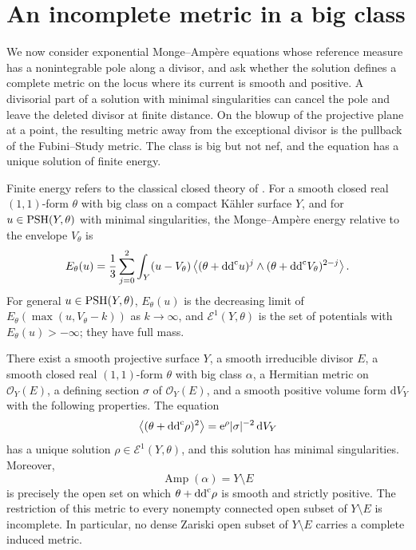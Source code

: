 \section{An incomplete metric in a big class}
\label{sec:incomplete-divisorial-metric}

We now consider exponential Monge--Amp\`ere equations whose reference measure has a nonintegrable pole along a divisor, and ask whether the solution defines a complete metric on the locus where its current is smooth and positive. A divisorial part of a solution with minimal singularities can cancel the pole and leave the deleted divisor at finite distance. On the blowup of the projective plane at a point, the resulting metric away from the exceptional divisor is the pullback of the Fubini--Study metric. The class is big but not nef, and the equation has a unique solution of finite energy.

Finite energy refers to the classical closed theory of \cite{SGPT}. For a smooth closed real $(1,1)$-form $\theta$ with big class on a compact K\"ahler surface $Y$, and for $u\in\mathrm{PSH}(Y,\theta)$ with minimal singularities, the Monge--Amp\`ere energy relative to the envelope $V_\theta$ is
\[
 E_\theta(u)=\frac13\sum_{j=0}^2
 \int_Y(u-V_\theta)
 \left\langle(\theta+\mathrm{dd}^{\mathrm{c}} u)^j\wedge
                (\theta+\mathrm{dd}^{\mathrm{c}} V_\theta)^{2-j}\right\rangle.
\]
For general $u\in\mathrm{PSH}(Y,\theta)$, $E_\theta(u)$ is the decreasing limit of $E_\theta(\max(u,V_\theta-k))$ as $k\to\infty$, and $\mathcal E^1(Y,\theta)$ is the set of potentials with $E_\theta(u)>-\infty$; they have full mass.

\begin{theorem}\label{thm:incomplete-divisorial-metric}
There exist a smooth projective surface $Y$, a smooth irreducible divisor $E$, a smooth closed real $(1,1)$-form $\theta$ with big class $\alpha$, a Hermitian metric on $\mathcal O_Y(E)$, a defining section $\sigma$ of $\mathcal O_Y(E)$, and a smooth positive volume form $\mathrm{d}V_Y$ with the following properties. The equation
\begin{equation}\label{eq:incomplete-divisorial-equation}
 \left\langle(\theta+\mathrm{dd}^{\mathrm{c}}\rho)^2\right\rangle
 =\mathrm{e}^{\rho}|\sigma|^{-2}\,\mathrm{d}V_Y
\end{equation}
has a unique solution $\rho\in\mathcal E^1(Y,\theta)$, and this solution has minimal singularities. Moreover,
\[
 \operatorname{Amp}(\alpha)=Y\setminus E
\]
is precisely the open set on which $\theta+\mathrm{dd}^{\mathrm{c}}\rho$ is smooth and strictly positive. The restriction of this metric to every nonempty connected open subset of $Y\setminus E$ is incomplete. In particular, no dense Zariski open subset of $Y\setminus E$ carries a complete induced metric.
\end{theorem}

